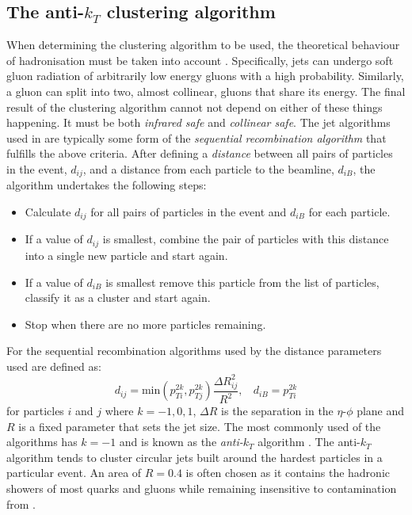 \subsection{The anti-$k_T$ clustering algorithm}

When determining the clustering algorithm to be used, the theoretical
behaviour of hadronisation must be taken into account
\cite{Salam2010}. Specifically, jets can undergo soft gluon radiation
of arbitrarily low energy gluons with a high probability.
Similarly, a gluon can split into two, almost collinear, gluons that share its energy.
The final result of the clustering algorithm cannot not depend
on either of these things happening. It must be both
\emph{infrared safe} and \emph{collinear safe}. The jet algorithms used in \CMS are
typically some form of the \emph{sequential recombination algorithm} that
fulfills the above criteria. After defining a \emph{distance}
between all pairs of particles in the event, $d_{ij}$, and a distance
from each particle to the beamline, $d_{iB}$, the algorithm undertakes
the following steps:
\begin{itemize}
\item{Calculate $d_{ij}$ for all pairs of particles in the event and
$d_{iB}$ for each particle.}
\item{If a value of $d_{ij}$ is smallest, combine the pair of particles
with this distance into a single new particle and start again.}
\item{If a value of $d_{iB}$ is smallest remove this particle from the
list of particles, classify it as a cluster and start again.}
\item{Stop when there are no more particles remaining.}
\end{itemize}
For the sequential recombination algorithms used by \CMS the distance
parameters used are defined as:
\begin{equation} \label{eq:antiktdij}
d_{ij} = \textrm{min}(p_{Ti}^{2k},p_{Tj}^{2k})\frac{\Delta R_{ij}^2}{R^2} ,~~~~d_{iB} = p_{Ti}^{2k}
\end{equation} 
for particles $i$ and $j$ where $k=-1,0,1$, $\Delta R$
is the separation in the $\eta$-$\phi$ plane and $R$ is a fixed
parameter that sets the jet size. The most commonly used of the \CMS
algorithms has $k=-1$ and is known as the \emph{anti-$k_T$} algorithm
\cite{1126-6708-2008-04-063}. The anti-$k_T$ algorithm tends to
cluster circular jets built around the hardest particles in a
particular event. An area of $R=0.4$ is often
chosen as it contains the hadronic showers of most quarks and gluons
while remaining insensitive to contamination from \PU.

